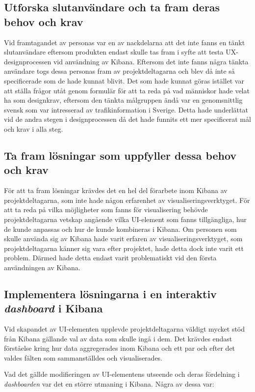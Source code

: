 \documentclass[12pt]{kththesis}
\begin{document}
\subsection{Utforska slutanvändare och ta fram deras behov och krav} 
Vid framtagandet av personas var en av nackdelarna att det inte fanns en tänkt slutanvändare eftersom produkten endast skulle tas fram i syfte att testa UX-designprocessen vid användning av Kibana. Eftersom det inte fanns några tänkta användare togs dessa personas fram av projektdeltagarna och blev då inte så specificerade som de hade kunnat blivit. Det som hade kunnat göras istället var att ställa frågor utåt genom formulär för att ta reda på vad människor hade velat ha som designkrav, eftersom den tänkta målgruppen ändå var en genomsnittlig svensk som var intresserad av trafikinformation i Sverige. Detta hade underlättat vid de andra stegen i designprocessen då det hade funnits ett mer specificerat mål och krav i alla steg.

\subsection{Ta fram lösningar som uppfyller dessa behov och krav}
För att ta fram lösningar krävdes det en hel del förarbete inom Kibana av projektdeltagarna, som inte hade någon erfarenhet av visualiseringsverktyget. För att ta reda på vilka möjligheter som fanns för visualisering behövde projektdeltagarna vetskap angående vilka UI-element som fanns tillgängliga, hur de kunde anpassas och hur de kunde kombineras i Kibana. Om personen som skulle använda sig av Kibana hade varit erfaren av visualiseringsverktyget, som projektdeltagarna känner sig vara efter projektet, hade detta dock inte varit ett problem. Därmed hade detta endast varit problematiskt vid den första användningen av Kibana.

\subsection{Implementera lösningarna i en interaktiv \textit{dashboard} i Kibana}

Vid skapandet av UI-elementen upplevde projektdeltagarna väldigt mycket stöd från Kibana gällande val av data som skulle ingå i dem. Det krävdes endast förståelse kring hur data aggregerades inom Kibana och ett par och efter det valdes fälten som sammanställdes och visualiserades. 

Vad det gällde modifieringen av UI-elementens utseende och deras fördelning i \textit{dashboarden} var det en större utmaning i Kibana. Några av dessa var:
\end{document}
